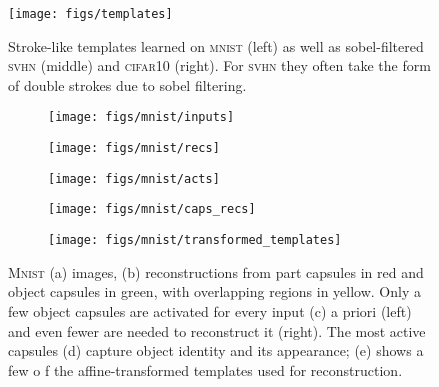 \documentclass{article}
\begin{document}
\begin{figure}
	\centering
	\begin{minipage}[c]{.7\linewidth}
		\texttt{[image: figs/templates]}
	\end{minipage}
	\hfill
	\begin{minipage}[c]{.29\linewidth}
		\caption{Stroke-like templates learned on \textsc{mnist} (left) as well as sobel-filtered \textsc{svhn} (middle) and \textsc{cifar10} (right).
			For \textsc{svhn} they often take the form of double strokes due to sobel filtering.
		}
		\label{fig:learned_templates}
	\end{minipage}
\end{figure}
\begin{figure}
	\centering
	\begin{subfigure}[c]{.06\linewidth}
		\texttt{[image: figs/mnist/inputs]}
		\caption{}
	\end{subfigure}
	\begin{subfigure}[c]{.06\linewidth}
		\texttt{[image: figs/mnist/recs]}
		\caption{}
	\end{subfigure}
	\begin{subfigure}[c]{.03967\linewidth}
		\texttt{[image: figs/mnist/acts]}
		\caption{}
	\end{subfigure}
	\begin{subfigure}[c]{.12\linewidth}
		\texttt{[image: figs/mnist/caps\_recs]}
		\caption{}
	\end{subfigure}
	\begin{subfigure}[c]{.30\linewidth}
		\texttt{[image: figs/mnist/transformed\_templates]}
		\caption{}
	\end{subfigure}
	\begin{minipage}[c]{.35\linewidth}
		\caption{
			\textsc{Mnist} (a) images, (b) reconstructions from part capsules in red and object capsules in green, with overlapping regions in yellow.
			Only a few object capsules are activated for every input (c) a priori (left) and even fewer are needed to reconstruct it (right).
			The most active capsules (d) capture object identity and its appearance;
			(e) shows a few o  f the affine-transformed templates used for reconstruction.
		}
		\label{fig:mnist_rec}
	\end{minipage}
\end{figure}
\end{document}
